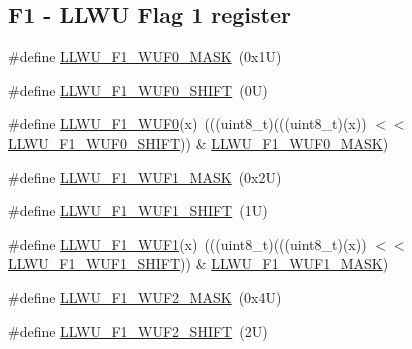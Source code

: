 \subsection*{F1 -\/ L\+L\+WU Flag 1 register}
\begin{DoxyCompactItemize}
\item 
\#define \mbox{\hyperlink{group___l_l_w_u___register___masks_ga1308a2e0d967a81b7fc32af6816cb532}{L\+L\+W\+U\+\_\+\+F1\+\_\+\+W\+U\+F0\+\_\+\+M\+A\+SK}}~(0x1\+U)
\item 
\#define \mbox{\hyperlink{group___l_l_w_u___register___masks_ga6a004e1e5a54356cf5b70d9f17b96afc}{L\+L\+W\+U\+\_\+\+F1\+\_\+\+W\+U\+F0\+\_\+\+S\+H\+I\+FT}}~(0\+U)
\item 
\#define \mbox{\hyperlink{group___l_l_w_u___register___masks_gadf947a1640b0c6ac4e501aec5b935154}{L\+L\+W\+U\+\_\+\+F1\+\_\+\+W\+U\+F0}}(x)~(((uint8\+\_\+t)(((uint8\+\_\+t)(x)) $<$$<$ \mbox{\hyperlink{group___l_l_w_u___register___masks_ga6a004e1e5a54356cf5b70d9f17b96afc}{L\+L\+W\+U\+\_\+\+F1\+\_\+\+W\+U\+F0\+\_\+\+S\+H\+I\+FT}})) \& \mbox{\hyperlink{group___l_l_w_u___register___masks_ga1308a2e0d967a81b7fc32af6816cb532}{L\+L\+W\+U\+\_\+\+F1\+\_\+\+W\+U\+F0\+\_\+\+M\+A\+SK}})
\item 
\#define \mbox{\hyperlink{group___l_l_w_u___register___masks_ga3513d59cf672e1dfd8884672b57c879b}{L\+L\+W\+U\+\_\+\+F1\+\_\+\+W\+U\+F1\+\_\+\+M\+A\+SK}}~(0x2\+U)
\item 
\#define \mbox{\hyperlink{group___l_l_w_u___register___masks_gadfac3bafc6a624b27f059e3d9cf3a899}{L\+L\+W\+U\+\_\+\+F1\+\_\+\+W\+U\+F1\+\_\+\+S\+H\+I\+FT}}~(1\+U)
\item 
\#define \mbox{\hyperlink{group___l_l_w_u___register___masks_ga550c62884c90b1a85c2fa07d1bfdcd48}{L\+L\+W\+U\+\_\+\+F1\+\_\+\+W\+U\+F1}}(x)~(((uint8\+\_\+t)(((uint8\+\_\+t)(x)) $<$$<$ \mbox{\hyperlink{group___l_l_w_u___register___masks_gadfac3bafc6a624b27f059e3d9cf3a899}{L\+L\+W\+U\+\_\+\+F1\+\_\+\+W\+U\+F1\+\_\+\+S\+H\+I\+FT}})) \& \mbox{\hyperlink{group___l_l_w_u___register___masks_ga3513d59cf672e1dfd8884672b57c879b}{L\+L\+W\+U\+\_\+\+F1\+\_\+\+W\+U\+F1\+\_\+\+M\+A\+SK}})
\item 
\#define \mbox{\hyperlink{group___l_l_w_u___register___masks_gabc46629018d0f2eb7a39896eb5225933}{L\+L\+W\+U\+\_\+\+F1\+\_\+\+W\+U\+F2\+\_\+\+M\+A\+SK}}~(0x4\+U)
\item 
\#define \mbox{\hyperlink{group___l_l_w_u___register___masks_gab99e1778fd26ccd69f31a56d94709e41}{L\+L\+W\+U\+\_\+\+F1\+\_\+\+W\+U\+F2\+\_\+\+S\+H\+I\+FT}}~(2\+U)
\item 

\end{DoxyCompactItemize}
